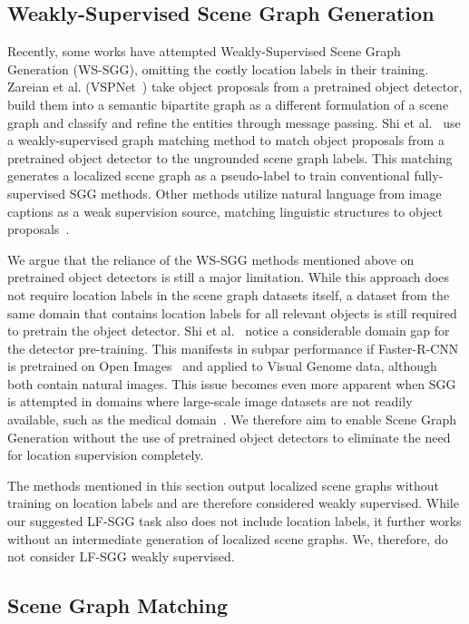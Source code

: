 \documentclass[10pt,twocolumn,letterpaper]{article}
\begin{document}
\subsection{Weakly-Supervised Scene Graph Generation}
Recently, some works have attempted Weakly-Supervised Scene Graph Generation (WS-SGG), omitting the costly location labels in their training. Zareian et al. (VSPNet~\cite{zareian_weakly_2020}) take object proposals from a pretrained object detector, build them into a semantic bipartite graph as a different formulation of a scene graph and classify and refine the entities through message passing. Shi et al.~\cite{shi_simple_2021} use a weakly-supervised graph matching method to match object proposals from a pretrained object detector to the ungrounded scene graph labels. This matching generates a localized scene graph as a pseudo-label to train conventional fully-supervised SGG methods. Other methods utilize natural language from image captions as a weak supervision source, matching linguistic structures to object proposals~\cite{zhong_learning_2021, ye_linguistic_2021, li_integrating_2022}.

We argue that the reliance of the WS-SGG methods mentioned above on pretrained object detectors is still a major limitation. While this approach does not require location labels in the scene graph datasets itself, a dataset from the same domain that contains location labels for all relevant objects is still required to pretrain the object detector. Shi et al.~\cite{shi_simple_2021} notice a considerable domain gap for the detector pre-training. This manifests in subpar performance if Faster-R-CNN is pretrained on Open Images~\cite{kuznetsova_open_2020} and applied to Visual Genome data, although both contain natural images. This issue becomes even more apparent when SGG is attempted in domains where large-scale image datasets are not readily available, such as the medical domain~\cite{ozsoy_4d-or_2022}. We therefore aim to enable Scene Graph Generation without the use of pretrained object detectors to eliminate the need for location supervision completely.

The methods mentioned in this section output localized scene graphs without training on location labels and are therefore considered weakly supervised. While our suggested LF-SGG task also does not include location labels, it further works without an intermediate generation of localized scene graphs. We, therefore, do not consider LF-SGG weakly supervised.

\subsection{Scene Graph Matching}
\end{document}
